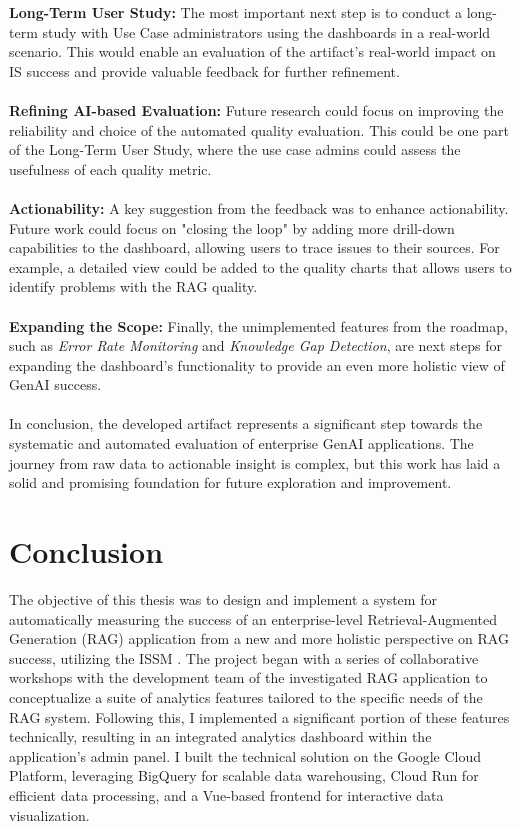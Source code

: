 \documentclass[
	english,
	ruledheaders=section,%
	class=report,%
	thesis={type=bachelor},%
	accentcolor=1b,%
	custommargins=true,%
	marginpar=false,%
	parskip=half-,%
	fontsize=11pt,%
	DIV=14,
]{tudapub}
\begin{document}
\textbf{Long-Term User Study:} The most important next step is to conduct a long-term study with Use Case administrators using the dashboards in a real-world scenario. This would enable an evaluation of the artifact's real-world impact on IS success \parencite{DeloneMcLean2003ISSuccessTenYearUpdate} and provide valuable feedback for further refinement.\\
\\
\textbf{Refining AI-based Evaluation:} Future research could focus on improving the reliability and choice of the automated quality evaluation. This could be one part of the Long-Term User Study, where the use case admins could assess the usefulness of each quality metric.\\
\\
\textbf{Actionability:} A key suggestion from the feedback was to enhance actionability. Future work could focus on "closing the loop" by adding more drill-down capabilities to the dashboard, allowing users to trace issues to their sources. For example, a detailed view could be added to the quality charts that allows users to identify problems with the RAG quality.\\
\\
\textbf{Expanding the Scope:} Finally, the unimplemented features from the roadmap, such as \textit{Error Rate Monitoring} and \textit{Knowledge Gap Detection}, are next steps for expanding the dashboard's functionality to provide an even more holistic view of GenAI success.\\
\\
In conclusion, the developed artifact represents a significant step towards the systematic and automated evaluation of enterprise GenAI applications. The journey from raw data to actionable insight is complex, but this work has laid a solid and promising foundation for future exploration and improvement.

\chapter{Conclusion}
The objective of this thesis was to design and implement a system for automatically measuring the success of an enterprise-level Retrieval-Augmented Generation (RAG) application from a new and more holistic perspective on RAG success, utilizing the ISSM \parencite{DeloneMcLean2003ISSuccessTenYearUpdate}. The project began with a series of collaborative workshops with the development team of the investigated RAG application to conceptualize a suite of analytics features tailored to the specific needs of the RAG system. Following this, I implemented a significant portion of these features technically, resulting in an integrated analytics dashboard within the application's admin panel. I built the technical solution on the Google Cloud Platform, leveraging BigQuery for scalable data warehousing, Cloud Run for efficient data processing, and a Vue-based frontend for interactive data visualization.
\end{document}
